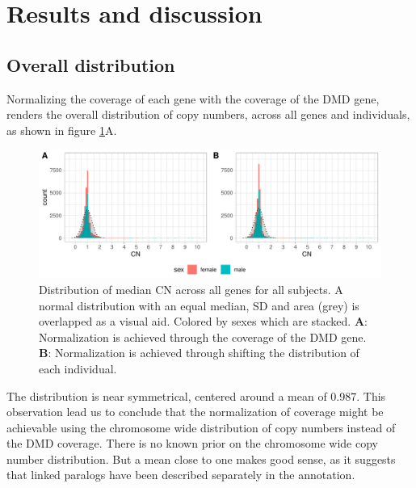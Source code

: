 
\section*{Results and discussion} %


\subsection*{Overall distribution}
Normalizing the coverage of each gene with the coverage of the DMD gene, renders the overall distribution of copy numbers, across all genes and individuals, as shown in figure \ref{fig:qc_dist_all}A. 

\begin{figure}[h] 
  \centering
  \includegraphics[scale=0.78]{figures/fig_overall_1and3.pdf}
  
  \caption{Distribution of median CN across all genes for all subjects. A normal distribution with an equal median, SD and area (grey) is overlapped as a visual aid. Colored by sexes which are stacked. \textbf{A}: Normalization is achieved through the coverage of the DMD gene. \textbf{B}: Normalization is achieved through shifting the distribution of each individual.}
  
  \label{fig:qc_dist_all}
\end{figure}

The distribution is near symmetrical, centered around a mean of 0.987. This observation lead us to conclude that the normalization of coverage might be achievable using the chromosome wide distribution of copy numbers instead of the DMD coverage. There is no known prior on the chromosome wide copy number distribution. But a mean close to one makes good sense, as it suggests that linked paralogs have been described separately in the annotation.%

